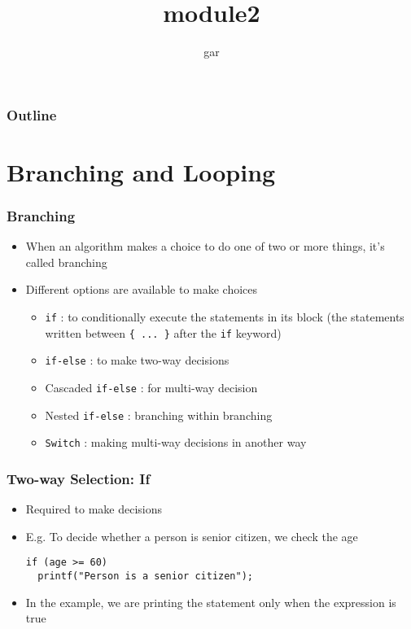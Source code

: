 \documentclass[11pt]{beamer}
\title{module2}
\author{gar}
\date{}
\begin{document}
\maketitle

\begin{frame}
\frametitle{Outline}
\setcounter{tocdepth}{3}
\tableofcontents
\end{frame}
\section{Branching and Looping}
\label{sec-1}
\begin{frame}[fragile]\frametitle{Branching}
\label{sec-1-1}

\begin{itemize}
\item When an algorithm makes a choice to do one of two or more things, it's called branching
\item Different options are available to make choices
\begin{itemize}
\item \verb~if~ : to conditionally execute the statements in its block (the statements written between \verb~{ ... }~ after the \verb~if~ keyword)
\item \verb~if-else~ : to make two-way decisions
\item Cascaded \verb~if-else~ : for multi-way decision
\item Nested \verb~if-else~ : branching within branching
\item \verb~Switch~ : making multi-way decisions in another way
\end{itemize}
\end{itemize}
\end{frame}
\begin{frame}[fragile]\frametitle{Two-way Selection: If}
\label{sec-1-2}

\begin{itemize}
\item Required to make decisions
\item E.g. To decide whether a person is senior citizen, we check the age

\begin{verbatim}
if (age >= 60)
  printf("Person is a senior citizen");
\end{verbatim}
\item In the example, we are printing the statement only when the expression is true
\end{itemize}
\end{frame}
\end{document}

